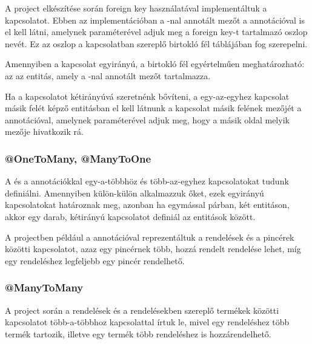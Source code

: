 A project elkészítése során foreign key használatával implementáltuk a kapcsolatot. Ebben az implementációban a -nal annotált mezőt a  annotációval is el kell látni, amelynek  paraméterével adjuk meg a foreign key-t tartalmazó oszlop nevét. Ez az oszlop a kapcsolatban szereplő birtokló fél táblájában fog szerepelni. \par

Amennyiben a kapcsolat egyirányú, a birtokló fél egyértelműen meghatározható: az az entitás, amely a -nal annotált mezőt tartalmazza.\par

Ha a kapcsolatot kétirányúvá szeretnénk bővíteni, a egy-az-egyhez kapcsolat másik felét képző entitásban el kell látnunk a kapcsolat másik felének mezőjét a  annotációval, amelynek  paraméterével adjuk meg, hogy a másik oldal melyik mezője hivatkozik rá. \par


\subsubsection{@OneToMany, @ManyToOne}
A  és a  annotációkkal egy-a-többhöz és több-az-egyhez kapcsolatokat tudunk definiálni. Amennyiben külön-külön alkalmazzuk őket, ezek egyirányú kapcsolatokat határoznak meg, azonban ha egymással párban, két entitáson, akkor egy darab, kétirányú kapcsolatot definiál az entitások között. \par

A projectben például a  annotációval reprezentáltuk a rendelések és a pincérek közötti kapcsolatot, azaz egy pincérnek több, hozzá rendelt rendelése lehet, míg egy rendeléshez legfeljebb egy pincér rendelhető.


\subsubsection{@ManyToMany}

A project során a rendelések és a rendelésekben szereplő termékek közötti kapcsolatot több-a-többhoz kapcsolattal írtuk le, mivel egy rendeléshez több termék tartozik, illetve egy termék több rendeléshez is hozzárendelhető. \par

